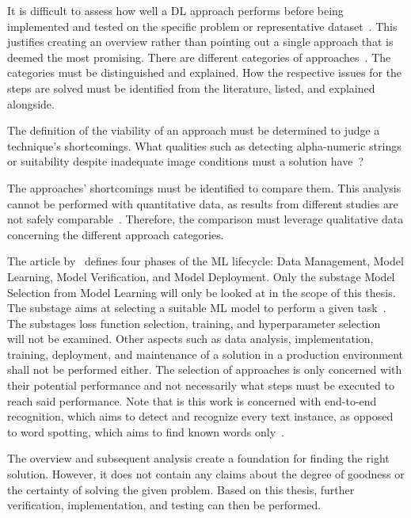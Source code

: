 It is difficult to assess how well a \ac{DL} approach performs before being implemented and tested
on the specific problem or representative dataset~\citep{arpteg_software_2018}.
This justifies creating an overview rather than pointing out a single approach that is
deemed the most promising.
There are different categories of approaches~\citep{chen_text_2021,long_scene_2021}.
The categories must be distinguished and explained.
How the respective issues for the steps are solved must be
identified from the literature, listed, and explained alongside.

The definition of the viability of an approach must be determined to judge a technique's shortcomings.
What qualities such as detecting alpha-numeric strings or suitability despite
inadequate image conditions must a solution have~\citep{ghosh_visual_2017, hu_gtc_2020}?

The approaches' shortcomings must be identified to compare them.
This analysis cannot be performed with quantitative data, as results from different studies are
not safely comparable~\citep{baek_what_2019,arpteg_software_2018,long_scene_2021}.
Therefore, the comparison must leverage qualitative data concerning the different approach
categories.

The article by~\cite{ashmore_assuring_2021} defines four phases of the \ac{ML} lifecycle:
Data Management, Model Learning, Model Verification, and Model Deployment.
Only the substage Model Selection from Model Learning will only be looked at in the scope of this
thesis.
The substage aims at selecting a suitable \ac{ML} model to perform a given
task~\citep{ashmore_assuring_2021}.
The substages loss function selection, training, and hyperparameter
selection~\citep{ashmore_assuring_2021} will not be examined.
Other aspects such as data analysis, implementation, training, deployment, and maintenance of a
solution in a production environment shall not be performed either.
The selection of approaches is only concerned with their potential performance and not
necessarily what steps must be executed to reach said performance.
Note that is this work is concerned with end-to-end recognition, which aims to detect and recognize
every text instance, as opposed to word spotting, which aims to find known
words only~\citep{chen_text_2021,karatzas_icdar_2015}.

The overview and subsequent analysis create a foundation for finding the right solution.
However, it does not contain any claims about the degree of goodness or the certainty of
solving the given problem.
Based on this thesis, further verification, implementation, and testing can then be performed.

